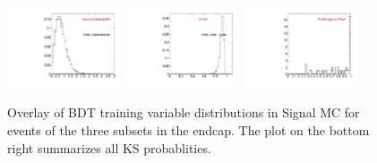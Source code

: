 \begin{figure}
  \includegraphics[width=0.3\textwidth]{Figures/VariablesComparison/MC_endcaps_figs_3h/delta3dErr}
  \includegraphics[width=0.3\textwidth]{Figures/VariablesComparison/MC_endcaps_figs_3h/pvw8}
  \includegraphics[width=0.3\textwidth]{Figures/VariablesComparison/MC_endcaps_figs_3h/KS}
  \caption{Overlay of BDT training variable distributions in Signal MC for events of the three subsets in the endcap. The plot on the bottom right summarizes all KS probablities.}
  \label{fig:MC_endcaps_figs_3h}
\end{figure}


